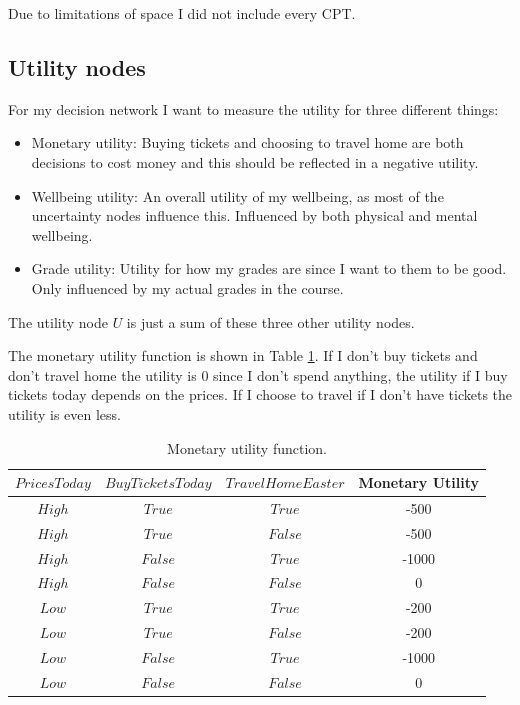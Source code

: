 \documentclass[11pt, a4paper, english]{../Template/NTNUoving}
\begin{document}
\begin{oppgave}
Due to limitations of space I did not include every CPT.
    \subsection{Utility nodes}

    For my decision network I want to measure the utility for three different things:

    \begin{itemize}
        \item Monetary utility: Buying tickets and choosing to travel home are both decisions to cost money and this should be reflected in a negative utility.
        \item Wellbeing utility: An overall utility of my wellbeing, as most of the uncertainty nodes influence this. Influenced by both physical and mental wellbeing.
        \item Grade utility: Utility for how my grades are since I want to them to be good. Only influenced by my actual grades in the course.
    \end{itemize}

    The utility node $U$ is just a sum of these three other utility nodes.

    The monetary utility function is shown in Table \ref{tab:MU}. If I don't buy tickets and don't travel home the
    utility is 0 since I don't spend anything, the utility if I buy tickets today depends on the prices. If I choose to travel
    if I don't have tickets the utility is even less.

    \begin{table}[H]
        \centering
        \begin{tabular}{|c|c|c|c|}
            \hline
            $PricesToday$ & $BuyTicketsToday$ & $TravelHomeEaster$ & Monetary Utility \\
            \hline
            $High$ & $True$ & $True$ & -500 \\ [1.0ex]
            $High$ & $True$ & $False$ & -500 \\ [1.0ex]
            $High$ & $False$ & $True$  & -1000 \\ [1.0ex]
            $High$ & $False$ & $False$  & 0 \\ [1.0ex]
            $Low$ & $True$ & $True$  & -200 \\ [1.0ex]
            $Low$ & $True$ & $False$  & -200 \\ [1.0ex]
            $Low$ & $False$ & $True$  & -1000 \\ [1.0ex]
            $Low$ & $False$ & $False$  & 0 \\ [1.0ex]
            \hline
        \end{tabular}
        \caption{Monetary utility function.}
        \label{tab:MU}
    \end{table}


\end{oppgave}
\end{document}
